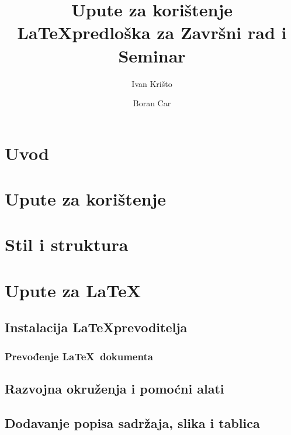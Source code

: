 \documentclass{zavrsni}
\begin{document}
\title{Upute za korištenje \LaTeX predloška za Završni rad i Seminar}
\author{Ivan Krišto \and Boran Car}

\maketitle

\tableofcontents

\chapter{Uvod}

\chapter{Upute za korištenje}

\chapter{Stil i struktura}

\chapter{Upute za \LaTeX}

\section{Instalacija \LaTeX prevoditelja}

\subsection{Prevođenje \LaTeX~dokumenta}

\section{Razvojna okruženja i pomoćni alati}

\section{Dodavanje popisa sadržaja, slika i tablica}
\end{document}
